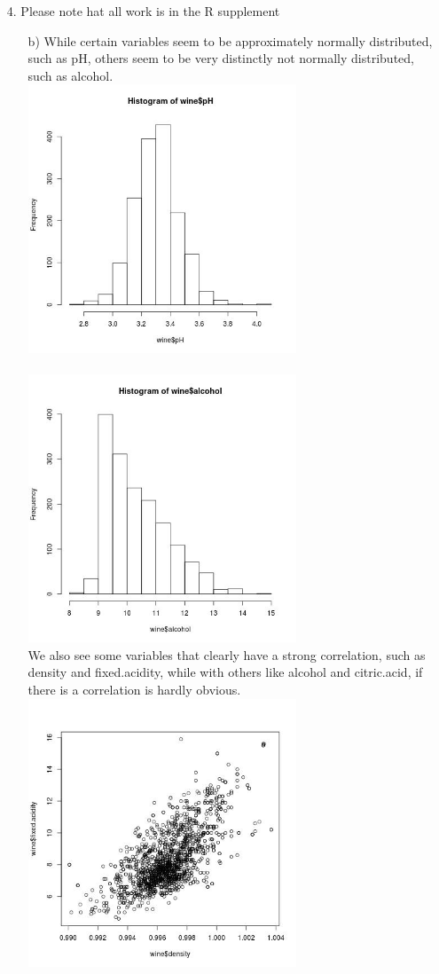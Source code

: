 \documentclass[11pt]{article}
\theoremstyle{definition}
\begin{document}
\begin{enumerate}
    \item[4.]
        Please note hat all work is in the R supplement
        \begin{enumerate}
            \item[b)]
                While certain variables seem to be approximately normally distributed, such as pH, others seem to be very distinctly not normally distributed, such as alcohol. 
                \\ \includegraphics[width=8cm]{hw1_4b_pH} \\ 
                \\ \includegraphics[width=8cm]{hw1_4b_alcohol} \\
                We also see some variables that clearly have a strong correlation, such as density and fixed.acidity, while with others like alcohol and citric.acid, if there is a correlation is hardly obvious.
                \\ \includegraphics[width=8cm]{hw1_4den_to_acid} \\ 

\end{enumerate}
\end{enumerate}
\end{document}
